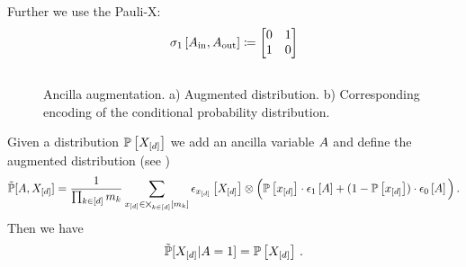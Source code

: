 \documentclass[aps,onecolumn,nofootinbib,pra]{article}
\newtheorem{definition}{Definition}
\begin{document}
    Further we use the Pauli-X:
    \begin{align*}
        \sigma_1\left[A_{\mathrm{in}},A_{\mathrm{out}}\right] \coloneqq
        \begin{bmatrix}
            0 & 1 \\
            1 & 0
        \end{bmatrix}
    \end{align*}


%

    \subsection{\ActivationCircuit{}}

    \begin{figure}
        \begin{center}
            
        \end{center}
        \caption{
            Ancilla augmentation.
            a) Augmented distribution.
            b) Corresponding encoding of the conditional probability distribution.
        }\label{fig:ancillaAugmentation}
    \end{figure}

    Given a distribution $\mathbb{P}\left[X_{[d]}\right]$ we add an ancilla variable $A$ and define the augmented distribution (see )
    \begin{align*}
        \tilde{\mathbb{P}}[A,X_{[d]}] =
        \frac{1}{\prod_{k\in[d]}m_{k}}
        \sum_{x_{[d]}\in\bigtimes_{k\in[d]}[m_{k}]} \epsilon_{x_{[d]}}\left[X_{[d]}\right]
        \otimes \Big(
        \mathbb{P}\left[x_{[d]}\right] \cdot \epsilon_{1}\left[A\right] + (1- \mathbb{P}\left[x_{[d]}\right]) \cdot \epsilon_{0}\left[A\right]
        \Big) \, .
    \end{align*}
    Then we have
    \begin{align*}
        \tilde{\mathbb{P}}[X_{[d]}|A=1] = \mathbb{P}\left[X_{[d]}\right] \, .
    \end{align*}
\end{document}
